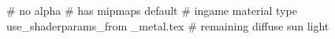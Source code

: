 # no alpha
# has mipmaps
default			 # ingame material type
use_shaderparams_from
_metal.tex		 # remaining diffuse sun light





